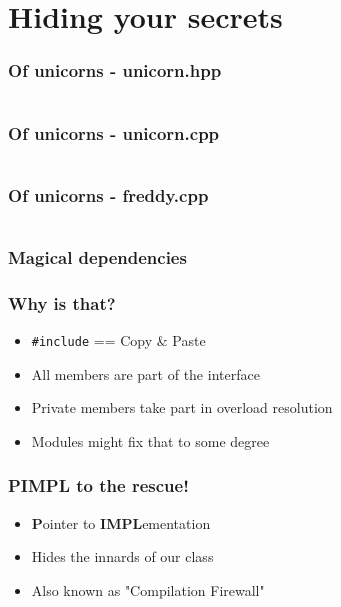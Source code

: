\section{Hiding your secrets}

\begin{frame}[c]
  \frametitle{Of unicorns - unicorn.hpp}
  \inputminted[fontsize=\footnotesize,firstline=7,lastline=19]{cpp}{code/nopimpl/unicorn.hpp}
\end{frame}

\begin{frame}[c]
  \frametitle{Of unicorns - unicorn.cpp}
  \inputminted[fontsize=\footnotesize,firstline=3]{cpp}{code/nopimpl/unicorn.cpp}
\end{frame}

\begin{frame}[c]
  \frametitle{Of unicorns - freddy.cpp}
  \inputminted[fontsize=\footnotesize]{cpp}{code/nopimpl/freddy.cpp}
\end{frame}

\begin{frame}[c]
  \frametitle{Magical dependencies}
\end{frame}

\begin{frame}[c]
  \frametitle{Why is that?}
  \pause{}
  \begin{itemize}
    \item \texttt{\#include} == Copy \& Paste\pause
    \item All members are part of the interface\pause
    \item Private members take part in overload resolution\pause
    \item Modules might fix that to some degree
  \end{itemize}
\end{frame}

\begin{frame}[c]
  \frametitle{PIMPL to the rescue!}
  \pause{}
  \begin{itemize}
    \item \textbf{P}ointer to \textbf{IMPL}ementation\pause
    \item Hides the innards of our class\pause
    \item Also known as "Compilation Firewall"
  \end{itemize}
\end{frame}


